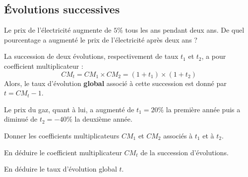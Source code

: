 \documentclass{article}
\begin{document}
\subsection{Évolutions successives}
\begin{example}
Le prix de l'électricité augmente de $5\%$ tous les ans pendant deux ans. De quel pourcentage a augmenté le prix de l'électricité après deux ans ?
\end{example}
\begin{center}
\end{center}
\begin{tcolorbox}
\begin{proposition}
La succession de deux évolutions, respectivement de taux $t_1$ et $t_2$, a pour coefficient multiplicateur :
\begin{equation*}
CM_t = CM_1 \times CM_2 = (1 + t_1) \times (1 + t_2)
\end{equation*}
Alors, le taux d'évolution \textbf{global} associé à cette succession est donné par $t = CM_t - 1$.
\end{proposition}
\end{tcolorbox}
\begin{example}
Le prix du gaz, quant à lui, a augmenté de $t_1 = 20\%$ la première année puis a diminué de $t_2 = -40\%$ la deuxième année.
\begin{enumquestions}
\item Donner les coefficients multiplicateurs $CM_1$ et $CM_2$ associés à $t_1$ et à $t_2$.
\item En déduire le coefficient multiplicateur $CM_t$ de la succession d'évolutions.
\item En déduire le taux d'évolution global $t$.    
\end{enumquestions}
\vspace*{0.5cm}

\emptybox{3cm}
\end{example}
\newpage
\end{document}
